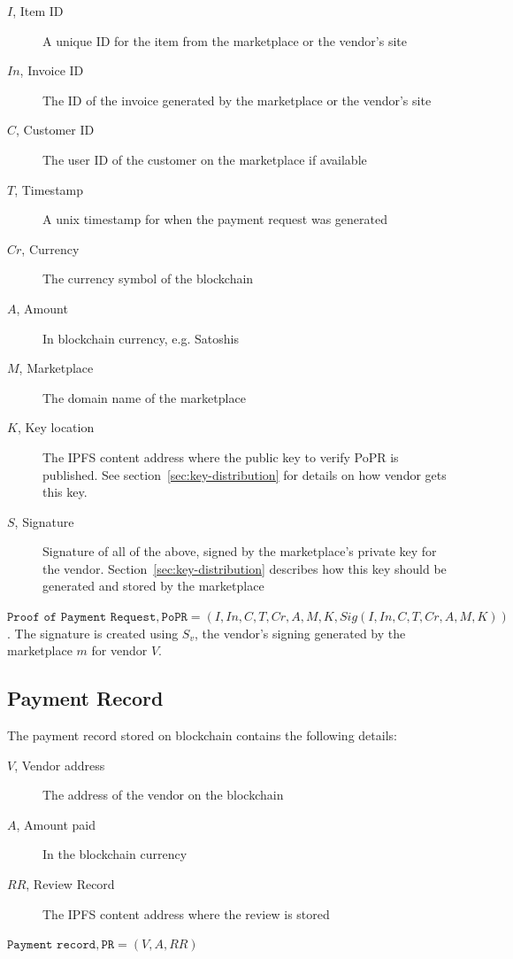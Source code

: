 \documentclass[a4paper]{article}
\begin{document}
\begin{description}
\item[$I$, Item ID] A unique ID for the item from the marketplace or the vendor's site
\item[$In$, Invoice ID] The ID of the invoice generated by the marketplace or the vendor's site
\item[$C$, Customer ID] The user ID of the customer on the marketplace if available
\item[$T$, Timestamp] A unix timestamp for when the payment request was generated
\item[$Cr$, Currency] The currency symbol of the blockchain
\item[$A$, Amount] In blockchain currency, e.g. Satoshis
\item[$M$, Marketplace] The domain name of the marketplace
\item[$K$, Key location] The IPFS content address where the public key
  to verify PoPR is published. See section~\ref{sec:key-distribution}
  for details on how vendor gets this key.
\item[$S$, Signature] Signature of all of the above, signed by the
  marketplace's private key for the
  vendor. Section~\ref{sec:key-distribution} describes how this key
  should be generated and stored by the marketplace
\end{description}

$\texttt{Proof of Payment Request}, \texttt{PoPR} = (I, In, C, T, Cr,
A, M, K, Sig(I,In,C, T, Cr, A, M, K))$. The signature is created using
$S_v$, the vendor's signing generated by the marketplace $m$ for
vendor $V$.

\subsection{Payment Record}

The payment record stored on blockchain contains the following
details:

\begin{description}
\item[$V$, Vendor address] The address of the vendor on the blockchain
\item[$A$, Amount paid] In the blockchain currency
\item[$RR$, Review Record] The IPFS content address where the review
  is stored
\end{description}

$\texttt{Payment record}, \texttt{PR} = (V, A, RR)$
\end{document}
